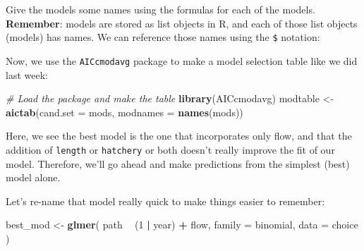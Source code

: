 \documentclass[
]{book}
\newenvironment{Shaded}{\begin{snugshade}}{\end{snugshade}}
\newcommand{\CommentTok}[1]{\textcolor[rgb]{0.56,0.35,0.01}{\textit{#1}}}
\newcommand{\ControlFlowTok}[1]{\textcolor[rgb]{0.13,0.29,0.53}{\textbf{#1}}}
\newcommand{\DataTypeTok}[1]{\textcolor[rgb]{0.13,0.29,0.53}{#1}}
\newcommand{\DecValTok}[1]{\textcolor[rgb]{0.00,0.00,0.81}{#1}}
\newcommand{\KeywordTok}[1]{\textcolor[rgb]{0.13,0.29,0.53}{\textbf{#1}}}
\newcommand{\NormalTok}[1]{#1}
\newcommand{\OperatorTok}[1]{\textcolor[rgb]{0.81,0.36,0.00}{\textbf{#1}}}
\newcommand{\StringTok}[1]{\textcolor[rgb]{0.31,0.60,0.02}{#1}}
\begin{document}
Give the models some names using the formulas for each of the models. \textbf{Remember}: models are stored as list objects in R, and each of those list objects (models) has names. We can reference those names using the \texttt{\$} notation:

\begin{Shaded}
\end{Shaded}

Now, we use the \texttt{AICcmodavg} package to make a model selection table like we did last week:

\begin{Shaded}
\begin{Highlighting}[]
\CommentTok{# Load the package and make the table}
\KeywordTok{library}\NormalTok{(AICcmodavg)}
\NormalTok{modtable <-}\StringTok{ }\KeywordTok{aictab}\NormalTok{(}\DataTypeTok{cand.set =}\NormalTok{ mods, }\DataTypeTok{modnames =} \KeywordTok{names}\NormalTok{(mods))}
\end{Highlighting}
\end{Shaded}

Here, we see the best model is the one that incorporates only flow, and that the addition of \texttt{length} or \texttt{hatchery} or both doesn't really improve the fit of our model. Therefore, we'll go ahead and make predictions from the simplest (best) model alone.

Let's re-name that model really quick to make things easier to remember:

\begin{Shaded}
\begin{Highlighting}[]
\NormalTok{best_mod <-}\StringTok{ }\KeywordTok{glmer}\NormalTok{(}
\NormalTok{  path }\OperatorTok{~}\StringTok{ }\NormalTok{(}\DecValTok{1} \OperatorTok{|}\StringTok{ }\NormalTok{year) }\OperatorTok{+}\StringTok{ }\NormalTok{flow,}
  \DataTypeTok{family =}\NormalTok{ binomial, }\DataTypeTok{data =}\NormalTok{ choice}
\NormalTok{)}
\end{Highlighting}
\end{Shaded}
\end{document}
